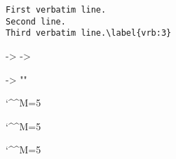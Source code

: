 \begin{Verbatim}
First verbatim line.
Second line.
Third verbatim line.\label{vrb:3}
\end{Verbatim}



\def\DefineVerbatimEnvironment#1#2#3{%
  \@namedef{#1}{\FV@Environment{#3}{#2}}%
  \@namedef{end#1}{\@nameuse{FVE@#2}}%
  \@namedef{#1*}{\FV@Environment{#3,showspaces}{#2}}%
  \@namedef{end#1*}{\@nameuse{FVE@#2}}}

%
%


\Verbatim -> 
\endVerbatim -> 


{}


\def\FV@Environment#1#2{%
  \def\FV@KeyValues{#1}%
  \catcode`\^^M=\active
  \@ifnextchar[%
    {\catcode`\^^M=5 \FV@GetKeyValues{\@nameuse{FVB@#2}}}%
    {\catcode`\^^M=5 \@nameuse{FVB@#2}}}

\FV@KeyValues -> ""


\def\FVB@Verbatim{\FV@VerbatimBegin\FV@Scan}

\def\FV@KeyValues{}
\catcode`\^^M=5
\FV@VerbatimBegin\FV@Scan


\def\FV@VerbatimBegin{\FV@List\z@}

\def\FV@KeyValues{}
\catcode`\^^M=5
\FV@List\z@
\FV@Scan


\def\FV@List#1{%
  \begingroup
  \FV@UseKeyValues
  \FV@LeaveVMode
  \if@inlabel\else\setbox\@labels=\box\voidb@x\fi
  \FV@ListNesting{#1}%
  \FV@ListParameterHook
  \FV@ListVSpace
  \FV@SetLineWidth
  \FV@InterLinePenalty
  \let\FV@ProcessLine\FV@ListProcessLine@i
  \FV@CatCodes
  \FV@FormattingPrep
  \FV@ObeyTabsInit
  \FV@BeginListFrame}

\def\FV@KeyValues{}
\catcode`\^^M=5
\begingroup
\FV@Scan  %


\def\FV@Scan{%
    \FV@CatCodes
    \VerbatimEnvironment
    \FV@DefineCheckEnd
    \FV@BeginScanning}

